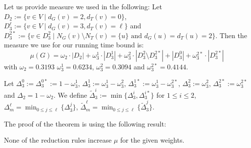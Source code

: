 \documentclass{llncs}
\newcommand{\longversion}[1]{#1}
\newcommand{\shortversion}[1]{}
\begin{document}
\shortversion{The proof is omitted for reasons of space, but we will}\longversion{Let us} provide measure we used in the following:
Let $D_2:=\{v \in V \mid d_G(v)=2, d_T(v)=0\}$, $D_3^\ell:=\{v \in V \mid d_G(v)=3, d_T(v)=\ell\}$ and $D_3^{2\ast}:=\{v \in D_3^2 \mid N_G(v)
\setminus N_T(v)=\{u\} \text{ and } d_G(u)=d_T(u)=2\}$. 
Then the measure we use for our running time bound is:
$$
\mu (G)=\omega_2 \cdot |D_2|+ \omega_3^1 \cdot |D_3^1| + \omega_3^2 \cdot |D_3^2 \setminus D_3^{2\ast}| + |D_3^0| + \omega_3^{2\ast}\cdot|D_3^{2\ast}|
$$
with $\omega_2=0.3193$    $\omega_3^1=0.6234$,    $\omega_3^2=0.3094$ and     $\omega_3^{2\ast}=0.4144$.\longversion{

Let $\Delta_3^0:=\Delta_3^{0\ast}:=1-\omega_3^{1}$, $\Delta_3^1:=\omega_3^1-\omega_3^{2}$, $\Delta_3^{1\ast}:=\omega_3^1-\omega_3^{2\ast}$, $\Delta_3^2:=\omega_3^2$, $\Delta_3^{2\ast}:=\omega_3^{2 \ast}$ and $\Delta_2=1-\omega_2$. We define $\tilde{\Delta}_3^{i}:= \min\{\Delta_3^i,\Delta_3^{i\ast}\}$ for $1 \le i \le 2$, 
$\Delta_m^{\ell}=\min_{0 \le j \le \ell} \{\Delta_3^j\}$, $\tilde \Delta_m^{\ell}=\min_{0 \le j \le \ell} \{\tilde \Delta_3^j\}$.}
\longversion{
 }
The proof of the theorem is using the following result:

\begin{lemma}\label{noinc}
None of the reduction rules increase $\mu$ for the given weights.
\end{lemma}
\end{document}
